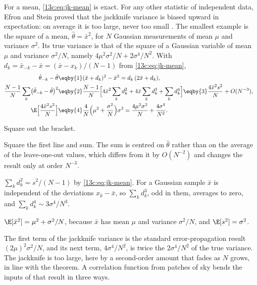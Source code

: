 For a mean, \eqref{13c:eq:jk-mean} is exact. For any other statistic of independent
data, Efron and Stein proved that the jackknife variance is biased upward in
expectation: on average it is too large, never too small \cite{EfronStein1981}. The smallest
example is the square of a mean, $\hat\theta=\bar x^2$, for $N$ Gaussian measurements
of mean $\mu$ and variance $\sigma^2$. Its true variance is that of the square of a
Gaussian variable of mean $\mu$ and variance $\sigma^2/N$, namely
$4\mu^2\sigma^2/N+2\sigma^4/N^2$. With $d_k=\bar x_{-k}-\bar x=(\bar x-x_k)/(N-1)$
from \eqref{13c:eq:jk-mean},
\begin{align}
  \hat\theta_{-k}-\hat\theta
  &\eqby{1}(\bar x+d_k)^2-\bar x^2=d_k\,(2\bar x+d_k),
  \nonumber\\
  \frac{N-1}{N}\sum_k\bigl(\hat\theta_{-k}-\hat\theta\bigr)^2
  &\eqby{2}\frac{N-1}{N}\Bigl[4\bar x^2\sum_kd_k^2+4\bar x\sum_kd_k^3+\sum_kd_k^4\Bigr]
   \eqby{3}\frac{4\bar x^2s^2}{N}+O(N^{-3}),
  \nonumber\\
  \E\Bigl[\frac{4\bar x^2s^2}{N}\Bigr]
  &\eqby{4}\frac{4}{N}\Bigl(\mu^2+\frac{\sigma^2}{N}\Bigr)\sigma^2
   =\frac{4\mu^2\sigma^2}{N}+\frac{4\sigma^4}{N^2}.
  \label{13c:eq:jk-bias}
\end{align}
\begin{explain}
  \item Square out the bracket.
  \item Square the first line and sum. The sum is centred on $\hat\theta$ rather than
        on the average of the leave-one-out values, which differs from it by
        $O(N^{-2})$ and changes the result only at order $N^{-3}$.
  \item $\sum_kd_k^2=s^2/(N-1)$ by \eqref{13c:eq:jk-mean}. For a Gaussian sample
        $\bar x$ is independent of the deviations $x_k-\bar x$, so $\sum_kd_k^3$, odd in
        them, averages to zero, and $\sum_kd_k^4\sim3\sigma^4/N^3$.
  \item $\E[\bar x^2]=\mu^2+\sigma^2/N$, because $\bar x$ has mean $\mu$ and variance
        $\sigma^2/N$, and $\E[s^2]=\sigma^2$.
\end{explain}
The first term of the jackknife variance is the standard error-propagation result
$(2\mu)^2\sigma^2/N$, and its next term, $4\sigma^4/N^2$, is twice the
$2\sigma^4/N^2$ of the true variance. The jackknife is too large, here by a second-order amount that fades
as $N$ grows, in line with the theorem. A
correlation function from patches of sky bends the inputs of that result in three
ways.
